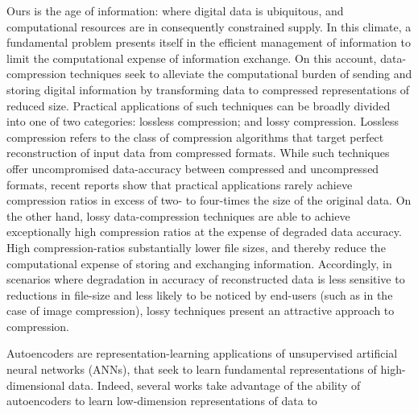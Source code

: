 

\noindent
Ours is the age of information: where digital data is ubiquitous, and computational resources are in consequently constrained supply.
In this climate, a fundamental problem presents itself in the efficient management of information to limit the computational expense of information exchange.
On this account, data-compression techniques seek to alleviate the computational burden of sending and storing digital information by transforming data to compressed representations of reduced size.
Practical applications of such techniques can be broadly divided into one of two categories: lossless compression; and lossy compression.
Lossless compression refers to the class of compression algorithms that target perfect reconstruction of input data from compressed formats.
While such techniques offer uncompromised data-accuracy between compressed and uncompressed formats, recent reports show that practical applications rarely achieve compression ratios in excess of two- to four-times the size of the original data.
On the other hand, lossy data-compression techniques are able to achieve exceptionally high compression ratios at the expense of degraded data accuracy.
High compression-ratios substantially lower file sizes, and thereby reduce the computational expense of storing and exchanging information. 
Accordingly, in scenarios where degradation in accuracy of reconstructed data is less sensitive to reductions in file-size and less likely to be noticed by end-users (such as in the case of image compression), lossy techniques present an attractive approach to compression. 

Autoencoders are representation-learning applications of unsupervised artificial neural networks (ANNs), that seek to learn fundamental representations of high-dimensional data.
Indeed, several works take advantage of the ability of autoencoders to learn low-dimension representations of data to  


